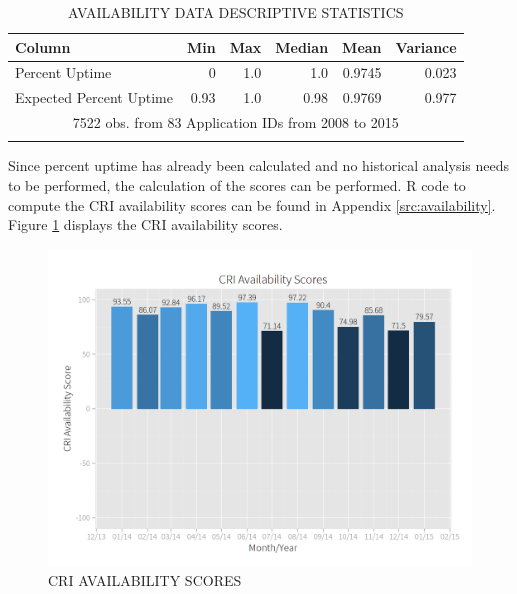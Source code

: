 \documentclass[SDSUThesis.tex]{subfiles}
\begin{document}
        \begin{longtable}{@{}l rr rrr}
            \toprule%
             \centering%
             {\bfseries Column}
             & {\bfseries Min}
             & {\bfseries Max}
             & {\bfseries Median}
             & {\bfseries Mean}
             & {\bfseries Variance} \\
            
            \cmidrule[0.2pt](r{0.125em}){1-1}%
            \cmidrule[0.2pt](lr{0.125em}){2-2}%
            \cmidrule[0.2pt](l{0.125em}){3-3}%
            \cmidrule[0.2pt](l{0.125em}){4-4}%
            \cmidrule[0.2pt](l{0.125em}){5-5}%
            \endhead
            
            Percent Uptime & 0 & 1.0 & 1.0 & 0.9745 & 0.023 \\
            \myrowcolour%
            Expected Percent Uptime & 0.93 & 1.0 & 0.98 & 0.9769  & 0.977\\
            
            \bottomrule
            
            \multicolumn{6}{c}{7522 obs. from 83 Application IDs from 2008 to 2015} \\
            
            \caption{AVAILABILITY DATA DESCRIPTIVE STATISTICS}
            \label{tab:availability_desc}
        \end{longtable}
        
        Since percent uptime has already been calculated and no historical
        analysis needs to be performed, the calculation of the scores
        can be performed. 
        R code to compute the CRI availability scores can be found in Appendix
        \ref{src:availability}. Figure \ref{fig:availability-scores} displays
        the CRI availability scores.  
        
        \begin{figure}[htb]
            \centering
            \includegraphics[scale=.3]{images/availability_scores.png}
            \caption{CRI AVAILABILITY SCORES}
            \label{fig:availability-scores}
        \end{figure}
        
\end{document}
